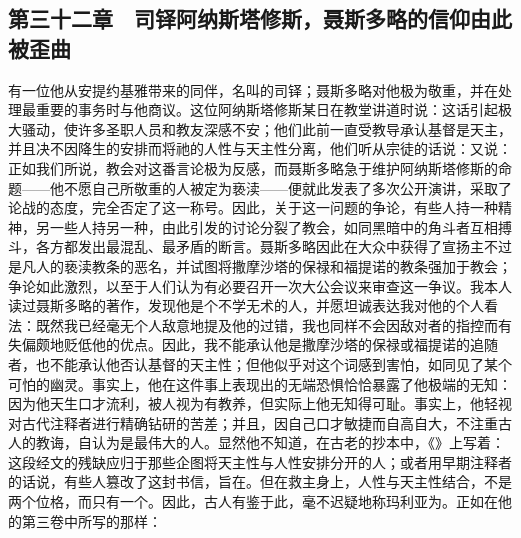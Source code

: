 \subsection{第三十二章　司铎阿纳斯塔修斯，聂斯多略的信仰由此被歪曲}

有一位他从安提约基雅带来的同伴，名叫的司铎；聂斯多略对他极为敬重，并在处理最重要的事务时与他商议。这位阿纳斯塔修斯某日在教堂讲道时说：这话引起极大骚动，使许多圣职人员和教友深感不安；他们此前一直受教导承认基督是天主，并且决不因降生的安排而将祂的人性与天主性分离，他们听从宗徒的话说：又说：正如我们所说，教会对这番言论极为反感，而聂斯多略急于维护阿纳斯塔修斯的命题——他不愿自己所敬重的人被定为亵渎——便就此发表了多次公开演讲，采取了论战的态度，完全否定了这一称号。因此，关于这一问题的争论，有些人持一种精神，另一些人持另一种，由此引发的讨论分裂了教会，如同黑暗中的角斗者互相搏斗，各方都发出最混乱、最矛盾的断言。聂斯多略因此在大众中获得了宣扬主不过是凡人的亵渎教条的恶名，并试图将撒摩沙塔的保禄和福提诺的教条强加于教会；争论如此激烈，以至于人们认为有必要召开一次大公会议来审查这一争议。我本人读过聂斯多略的著作，发现他是个不学无术的人，并愿坦诚表达我对他的个人看法：既然我已经毫无个人敌意地提及他的过错，我也同样不会因敌对者的指控而有失偏颇地贬低他的优点。因此，我不能承认他是撒摩沙塔的保禄或福提诺的追随者，也不能承认他否认基督的天主性；但他似乎对这个词感到害怕，如同见了某个可怕的幽灵。事实上，他在这件事上表现出的无端恐惧恰恰暴露了他极端的无知：因为他天生口才流利，被人视为有教养，但实际上他无知得可耻。事实上，他轻视对古代注释者进行精确钻研的苦差；并且，因自己口才敏捷而自高自大，不注重古人的教诲，自认为是最伟大的人。显然他不知道，在古老的抄本中，《》上写着：这段经文的残缺应归于那些企图将天主性与人性安排分开的人；或者用早期注释者的话说，有些人篡改了这封书信，旨在。但在救主身上，人性与天主性结合，不是两个位格，而只有一个。因此，古人有鉴于此，毫不迟疑地称玛利亚为。正如在他的第三卷中所写的那样：\par

\par

